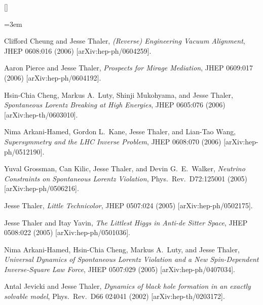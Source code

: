 \begin{list}{[]\addtocounter{jessecount}{-1}}{\leftmargin=3em \itemsep=4pt}
\item
 Clifford Cheung and Jesse Thaler,
\emph{(Reverse) Engineering Vacuum Alignment},
JHEP 0608:016 (2006)
[arXiv:hep-ph/0604259].

\item
 Aaron Pierce and Jesse Thaler,
\emph{Prospects for Mirage Mediation},
JHEP 0609:017 (2006)
[arXiv:hep-ph/0604192].

\item
 Hsin-Chia Cheng, Markus A.\ Luty, Shinji Mukohyama, and Jesse Thaler,
\emph{Spontaneous Lorentz Breaking at High Energies},
JHEP 0605:076 (2006)
[arXiv:hep-th/0603010].

\item
 Nima Arkani-Hamed, Gordon L.\ Kane, Jesse Thaler, and Lian-Tao Wang,
\emph{Supersymmetry and the LHC Inverse Problem},
JHEP 0608:070 (2006)
[arXiv:hep-ph/0512190].

\item
 Yuval Grossman, Can Kilic, Jesse Thaler, and Devin G.\ E.\ Walker,
\emph{Neutrino Constraints on Spontaneous Lorentz Violation},
Phys.\ Rev.\ D72:125001 (2005)
[arXiv:hep-ph/0506216].

\item
 Jesse Thaler,
\emph{Little Technicolor},
JHEP 0507:024 (2005)
[arXiv:hep-ph/0502175].

\item
 Jesse Thaler and Itay Yavin,
\emph{The Littlest Higgs in Anti-de Sitter Space},
JHEP 0508:022 (2005)
[arXiv:hep-ph/0501036].

\item
 Nima Arkani-Hamed, Hsin-Chia Cheng, Markus A.\ Luty, and Jesse Thaler,
\emph{Universal Dynamics of Spontaneous Lorentz Violation and a New Spin-Dependent Inverse-Square Law Force},
JHEP 0507:029 (2005)
[arXiv:hep-ph/0407034].

\item
 Antal Jevicki and Jesse Thaler,
\emph{Dynamics of black hole formation in an exactly solvable model},
Phys.\ Rev.\ D66 024041 (2002)
[arXiv:hep-th/0203172].

\end{list}
